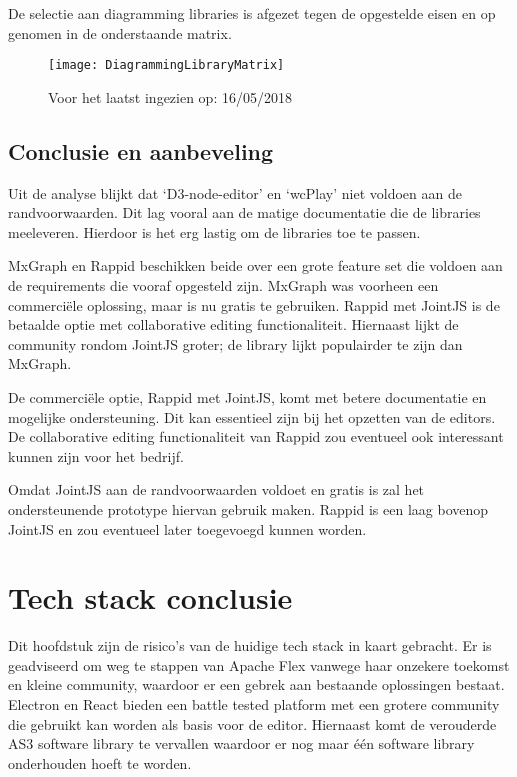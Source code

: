 De selectie aan diagramming libraries is afgezet tegen de opgestelde eisen en op genomen in de onderstaande matrix.

\begin{figure}[htb]
    \texttt{[image: DiagrammingLibraryMatrix]}
    \caption{Voor het laatst ingezien op: 16/05/2018}
    \centering    
\end{figure}

\subsection{Conclusie en aanbeveling}
Uit de analyse blijkt dat ‘D3-node-editor’ en ‘wcPlay’ niet voldoen aan de randvoorwaarden. Dit lag vooral aan de matige documentatie die de libraries meeleveren. Hierdoor is het erg lastig om de libraries toe te passen.

MxGraph en Rappid beschikken beide over een grote feature set die voldoen aan de requirements die vooraf opgesteld zijn. MxGraph was voorheen een commerciële oplossing, maar is nu gratis te gebruiken. Rappid met JointJS is de betaalde optie met collaborative editing functionaliteit. Hiernaast lijkt de community rondom JointJS groter; de library lijkt populairder te zijn dan MxGraph.

De commerciële optie, Rappid met JointJS, komt met betere documentatie en mogelijke ondersteuning. Dit kan essentieel zijn bij het opzetten van de editors. De collaborative editing functionaliteit van Rappid zou eventueel ook interessant kunnen zijn voor het bedrijf.

Omdat JointJS aan de randvoorwaarden voldoet en gratis is zal het ondersteunende prototype hiervan gebruik maken. Rappid is een laag bovenop JointJS en zou eventueel later toegevoegd kunnen worden.

\section{Tech stack conclusie}
Dit hoofdstuk zijn de risico’s van de huidige tech stack in kaart gebracht. Er is geadviseerd om weg te stappen van Apache Flex vanwege haar onzekere toekomst en kleine community, waardoor er een gebrek aan bestaande oplossingen bestaat. Electron en React bieden een battle tested platform met een grotere community die gebruikt kan worden als basis voor de editor. Hiernaast komt de verouderde AS3 software library te vervallen waardoor er nog maar één software library onderhouden hoeft te worden.

